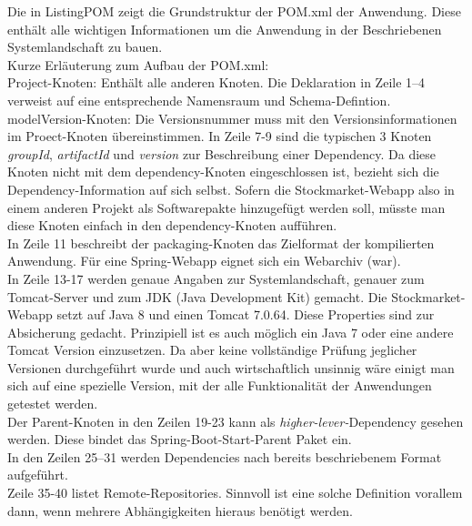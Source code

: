Die in ListingPOM zeigt die Grundstruktur der POM.xml der Anwendung. Diese enthält alle wichtigen Informationen um die Anwendung in der Beschriebenen Systemlandschaft zu bauen.\\
Kurze Erläuterung zum Aufbau der POM.xml: \\
Project-Knoten: Enthält alle anderen Knoten. Die Deklaration in 
Zeile 1--4 verweist auf eine entsprechende Namensraum und Schema-Defintion. 
modelVersion-Knoten: Die Versionsnummer muss mit den Versionsinformationen im Proect-Knoten übereinstimmen.
In Zeile 7-9 sind die typischen 3 Knoten \emph{groupId}, \emph{artifactId} und \emph{version} zur Beschreibung einer Dependency. Da diese Knoten nicht mit dem dependency-Knoten eingeschlossen ist, bezieht sich die Dependency-Information auf sich selbst. Sofern die Stockmarket-Webapp also in einem anderen Projekt als Softwarepakte hinzugefügt werden soll, müsste man diese Knoten einfach in den
dependency-Knoten aufführen.\\

In Zeile 11 beschreibt der packaging-Knoten das Zielformat der kompilierten Anwendung. Für eine Spring-Webapp eignet sich ein Webarchiv (war).\\ 

In Zeile 13-17 werden genaue Angaben zur Systemlandschaft, genauer zum Tomcat-Server und zum JDK (Java Development Kit) gemacht. Die Stockmarket-Webapp setzt auf Java 8 und einen Tomcat 7.0.64.
Diese Properties sind zur Absicherung gedacht. Prinzipiell ist es auch möglich ein Java 7 oder eine andere Tomcat Version einzusetzen. Da aber keine vollständige Prüfung jeglicher Versionen durchgeführt wurde und auch wirtschaftlich unsinnig wäre einigt man sich auf eine spezielle Version, mit der alle Funktionalität der Anwendungen getestet werden. \\

Der Parent-Knoten in den Zeilen 19-23 kann als \emph{higher-lever-}Dependency gesehen werden. Diese bindet das Spring-Boot-Start-Parent Paket ein.\\

In den Zeilen 25--31 werden Dependencies nach bereits beschriebenem Format aufgeführt.\\

Zeile 35-40 listet Remote-Repositories. Sinnvoll ist eine solche Definition vorallem dann, wenn mehrere Abhängigkeiten hieraus benötigt werden. 

